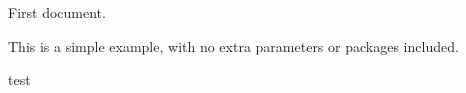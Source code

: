 \documentclass{article}
\begin{document}
First document. 

This is a simple example, with no extra parameters or packages included.

test 
\end{document}
